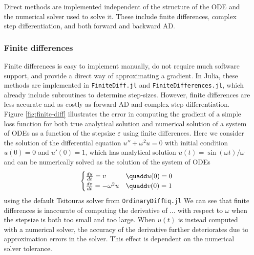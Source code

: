 Direct methods are implemented independent of the structure of the ODE and the numerical solver used to solve it. 
These include finite differences, complex step differentiation, and both forward and backward AD. 

\subsubsection{Finite differences}

Finite differences is easy to implement manually, do not require much software support, and provide a direct way of approximating a gradient. 
In Julia, these methods are implemented in \texttt{FiniteDiff.jl} and \texttt{FiniteDifferences.jl}, which already include subroutines to determine step-sizes.
However, finite differences are less accurate and as costly as forward AD \cite{Griewank_1989} and complex-step differentiation. 
Figure \ref{fig:finite-diff} illustrates the error in computing the gradient of a simple loss function for both true analytical solution and numerical solution of a system of ODEs as a function of the stepsize $\varepsilon$ using finite differences.
Here we consider the solution of the differential equation $u'' + \omega^2 u = 0$ with initial condition $u(0)=0$ and $u'(0)=1$, which has analytical solution $u(t) = \sin(\omega t) / \omega$ and can be numerically solved as the solution of the system of ODEs
\begin{equation}
\begin{cases}
    \frac{du}{dt} = v  & \quadd u(0) = 0 \\
    \frac{dv}{dt} = - \omega^2 u  & \quadd v(0) = 1
\end{cases}
\end{equation}
using the default Tsitouras solver \cite{Tsitouras_2011} from \texttt{OrdinaryDiffEq.jl}
We can see that finite differences is inaccurate of computing the derivative of ... with respect to $\omega$ when the stepsize is both too small and too large.
When $u(t)$ is instead computed with a numerical solver, the accuracy of the derivative further deteriorates due to approximation errors in the solver. 
This effect is dependent on the numerical solver tolerance.

